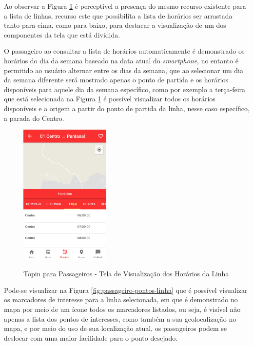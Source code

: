 {{{{{{{Ao observar a Figura \ref{fig:passageiro-horarios-linha} é perceptível a presença do mesmo recurso existente
para a lista de linhas, recurso este que possibilita a lista de horários ser arrastada tanto para cima, como
para baixo, para destacar a visualização de um dos componentes da tela que está dividida.

O passageiro ao consultar a lista de horários automaticamente é demonstrado os horários do dia da semana baseado
na data atual do \textit{smartphone}, no entanto é permitido ao usuário alternar entre os dias da semana, que ao
selecionar um dia da semana diferente será mostrado apenas o ponto de partida e os horários disponíveis para aquele
dia da semana específico, como por exemplo a terça-feira que está selecionada na Figura \ref{fig:passageiro-horarios-linha}
é possível visualizar todos os horários disponíveis e a origem a partir do ponto de partida da linha, nesse
caso específico, a parada do Centro.

\begin{figure}[H]
\caption{Topin para Passageiros - Tela de Visualização dos Horários da Linha}
\centering
\includegraphics[width=0.4\textwidth]{imagens/horarios-linha.png}
\label{fig:passageiro-horarios-linha}
\end{figure}

Pode-se visualizar na Figura \ref{fig:passageiro-pontos-linha} que é possível visualizar os marcadores de interesse para a linha selecionada, em que é demonstrado no mapa por meio de um ícone todos os marcadores listados, ou seja, é visível não apenas a lista dos pontos de interesses, como também a sua geolocalização no mapa, e por meio do uso de sua localização atual, os passageiros podem se deslocar com uma maior facilidade para o ponto desejado.

}}}}}}}
